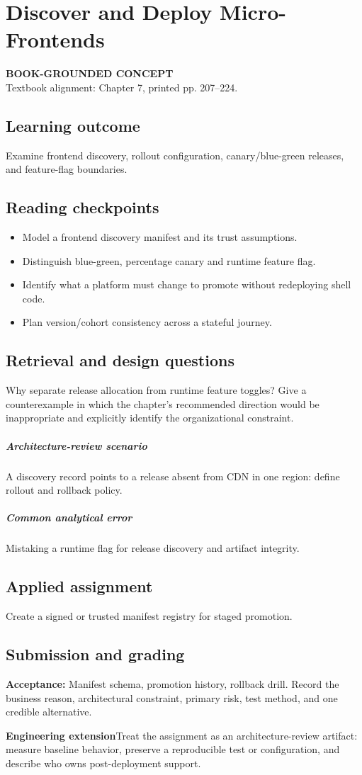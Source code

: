 \documentclass[11pt,letterpaper,oneside]{report}
\newcommand{\based}[1]{\begin{sourcebox}\textbf{BOOK-GROUNDED CONCEPT}\\#1\end{sourcebox}}
\newcommand{\criterion}[1]{\textbf{Acceptance:} #1}
\begin{document}
\chapter{Discover and Deploy Micro-Frontends}
\based{Textbook alignment: Chapter 7, printed pp. 207--224.}
\section{Learning outcome}
Examine frontend discovery, rollout configuration, canary/blue-green releases, and feature-flag boundaries.
\section{Reading checkpoints}
\begin{itemize}\item Model a frontend discovery manifest and its trust assumptions.
\item Distinguish blue-green, percentage canary and runtime feature flag.
\item Identify what a platform must change to promote without redeploying shell code.
\item Plan version/cohort consistency across a stateful journey.
\end{itemize}
\section{Retrieval and design questions}
Why separate release allocation from runtime feature toggles? Give a counterexample in which the chapter's recommended direction would be inappropriate and explicitly identify the organizational constraint.
\paragraph{Architecture-review scenario} A discovery record points to a release absent from CDN in one region: define rollout and rollback policy.
\paragraph{Common analytical error} Mistaking a runtime flag for release discovery and artifact integrity.
\section{Applied assignment}
Create a signed or trusted manifest registry for staged promotion.
\section{Submission and grading}
\criterion{Manifest schema, promotion history, rollback drill. Record the business reason, architectural constraint, primary risk, test method, and one credible alternative.}
\begin{engineerbox}\textbf{Engineering extension}\newline Treat the assignment as an architecture-review artifact: measure baseline behavior, preserve a reproducible test or configuration, and describe who owns post-deployment support.\end{engineerbox}
\end{document}

